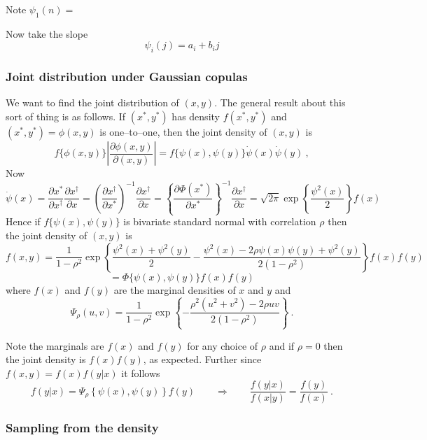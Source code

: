 Note $\psi_1(n)=$

Now take the slope
$$
\psi_i(j) = a_i+b_ij
$$


\subsubsection{Joint distribution under Gaussian copulas}




We want to find the joint distribution of $(x,y)$.  The general result about this sort of thing is as follows.   If $(x^*,y^*)$ has density $f(x^*,y^*)$ and $(x^*,y^*)=\phi(x,y)$ is one--to--one, then the joint density of $(x,y)$ is
$$
f\{\phi(x,y)\}\left|\frac{\partial \phi(x,y)}{\partial (x,y)}\right|=f\{\psi(x),\psi(y)\}\dot\psi(x)\dot\psi(y)\ ,
$$
Now
$$
\dot\psi(x) = \frac{\partial x^*}{\partial x^\dag}\frac{\partial x^\dag}{\partial x}= \left(\frac{\partial x^\dag}{\partial x^*}\right)^{-1}\frac{\partial x^\dag}{\partial x}=\left\{\frac{\partial \Phi(x^*)}{\partial x^*}\right\}^{-1}\frac{\partial x^\dag}{\partial x}=\sqrt{2\pi}\exp\left\{\frac{\psi^2(x)}{2}\right\}f(x)
$$
Hence if $f\{\psi(x),\psi(y)\}$ is bivariate standard normal with correlation $\rho$ then
the joint density  of $(x,y)$ is
$$
f(x,y)=\frac{1}{1-\rho^2}\exp\left\{\frac{\psi^2(x)+\psi^2(y)}{2}-\frac{\psi^2(x)-2\rho\psi(x)\psi(y)+\psi^2(y)}{2(1-\rho^2)}\right\} f(x) f(y)
$$$$
=\Phi\{\psi(x),\psi(y)\}f(x)f(y)
$$
where $f(x)$ and $f(y)$ are the marginal densities of $x$ and $y$ and
$$
\Psi_\rho(u,v)= \frac{1}{1-\rho^2}\exp\left\{-\frac{\rho^2(u^2+v^2)-2\rho uv}{2(1-\rho^2)}\right\}\ .
$$

Note the marginals are $f(x)$ and $f(y)$ for any choice of $\rho$ and if $\rho=0$ then the joint density is $f(x)f(y)$, as expected. Further since $f(x,y)=f(x)f(y|x)$ it follows
$$
f(y|x)=\Psi_\rho\left\{\psi(x),\psi(y)\right\}f(y)\qquad\Rightarrow\qquad \frac{f(y|x)}{f(x|y)}=\frac{f(y)}{f(x)}\ .
$$ 

\subsubsection{Sampling from the density}

